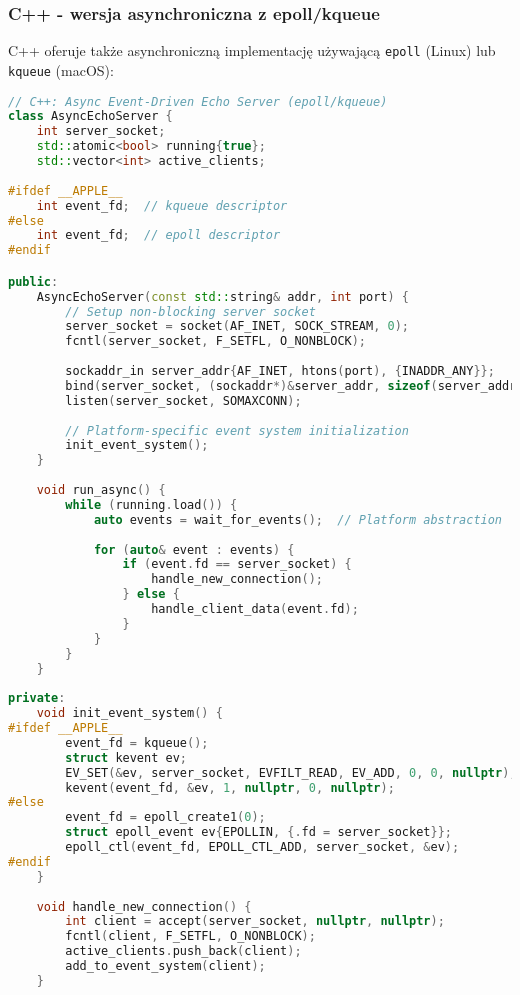\subsubsection{C++ - wersja asynchroniczna z epoll/kqueue}
C++ oferuje także asynchroniczną implementację używającą \texttt{epoll} (Linux) lub \texttt{kqueue} \mbox{(macOS)}:
\begin{lstlisting}[language=C++, style=VS2017,  caption={Async Echo Serwer w C++ z event loop}, label={lst:cpp_async_echo_server}]
// C++: Async Event-Driven Echo Server (epoll/kqueue)
class AsyncEchoServer {
    int server_socket;
    std::atomic<bool> running{true};
    std::vector<int> active_clients;
    
#ifdef __APPLE__
    int event_fd;  // kqueue descriptor
#else  
    int event_fd;  // epoll descriptor
#endif

public:
    AsyncEchoServer(const std::string& addr, int port) {
        // Setup non-blocking server socket
        server_socket = socket(AF_INET, SOCK_STREAM, 0);
        fcntl(server_socket, F_SETFL, O_NONBLOCK);
        
        sockaddr_in server_addr{AF_INET, htons(port), {INADDR_ANY}};
        bind(server_socket, (sockaddr*)&server_addr, sizeof(server_addr));
        listen(server_socket, SOMAXCONN);
        
        // Platform-specific event system initialization
        init_event_system();
    }
    
    void run_async() {
        while (running.load()) {
            auto events = wait_for_events();  // Platform abstraction
            
            for (auto& event : events) {
                if (event.fd == server_socket) {
                    handle_new_connection();
                } else {
                    handle_client_data(event.fd);
                }
            }
        }
    }
    
private:
    void init_event_system() {
#ifdef __APPLE__
        event_fd = kqueue();
        struct kevent ev;
        EV_SET(&ev, server_socket, EVFILT_READ, EV_ADD, 0, 0, nullptr);
        kevent(event_fd, &ev, 1, nullptr, 0, nullptr);
#else
        event_fd = epoll_create1(0);
        struct epoll_event ev{EPOLLIN, {.fd = server_socket}};
        epoll_ctl(event_fd, EPOLL_CTL_ADD, server_socket, &ev);
#endif
    }
    
    void handle_new_connection() {
        int client = accept(server_socket, nullptr, nullptr);
        fcntl(client, F_SETFL, O_NONBLOCK);
        active_clients.push_back(client);
        add_to_event_system(client);
    }
    

\end{lstlisting}
